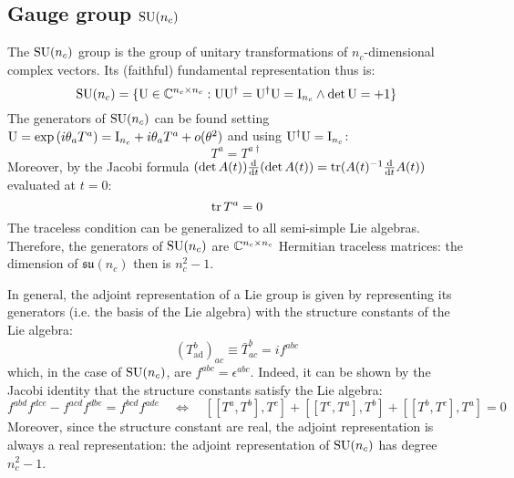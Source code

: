 \subsection{Gauge group \texorpdfstring{$ \mathrm{SU}(n_c) $}{SU(n)}}
\label{ssec:sun}

The $ \mathrm{SU}(n_c) $ group is the group of unitary transformations of $ n_c $-dimensional complex vectors. Its (faithful) fundamental representation thus is:
\begin{equation*}
  \mathrm{SU}(n_c) = \{\mathrm{U} \in \mathbb{C}^{n_c \times n_c} : \mathrm{U}\mathrm{U}^\dagger = \mathrm{U}^\dagger\mathrm{U} = \mathrm{I}_{n_c} \land \det{\mathrm{U}} = +1 \}
\end{equation*}
The generators of $ \mathrm{SU}(n_c) $ can be found setting $ \mathrm{U} = \exp \left( i \theta_a T^a \right) = \mathrm{I}_{n_c} + i \theta_a T^a + o(\theta^2) $ and using $ \mathrm{U}^\dagger\mathrm{U} = \mathrm{I}_{n_c} $:
\begin{equation}
  T^a = T^{a\dagger}
  \label{eq:sun-herm}
\end{equation}
Moreover, by the Jacobi formula $ (\det A(t)) \frac{\mathrm{d}}{\mathrm{d} t} (\det A(t)) = \operatorname{tr} (A(t)^{-1} \frac{\mathrm{d}}{\mathrm{d} t} A(t)) $ evaluated at $ t = 0 $:
\begin{equation}
  \operatorname{tr} T^a = 0
  \label{eq:sun-trace}
\end{equation}
The traceless condition can be generalized to all semi-simple Lie algebras.
Therefore, the generators of $ \mathrm{SU}(n_c) $ are $ \mathbb{C}^{n_c \times n_c} $ Hermitian traceless matrices: the dimension of $ \mathfrak{su}(n_c) $ then is $ n_c^2 - 1 $.

In general, the adjoint representation of a Lie group is given by representing its generators (i.e. the basis of the Lie algebra) with the structure constants of the Lie algebra:
\begin{equation}
  (T^b_\text{ad})_{ac} \equiv \bar{T}^b_{ac} = i f^{abc}
\end{equation}
which, in the case of $ \mathrm{SU}(n_c) $, are $ f^{abc} = \epsilon^{abc} $. Indeed, it can be shown by the Jacobi identity that the structure constants satisfy the Lie algebra:
\begin{equation*}
  f^{abd} f^{dce} - f^{acd} f^{dbe} = f^{bcd} f^{ade}
  \quad \iff \quad
  [[T^a,T^b],T^c] + [[T^c,T^a],T^b] + [[T^b,T^c],T^a] = 0
\end{equation*}
Moreover, since the structure constant are real, the adjoint representation is always a real representation: the adjoint representation of $ \mathrm{SU}(n_c) $ has degree $ n_c^2 - 1 $.


